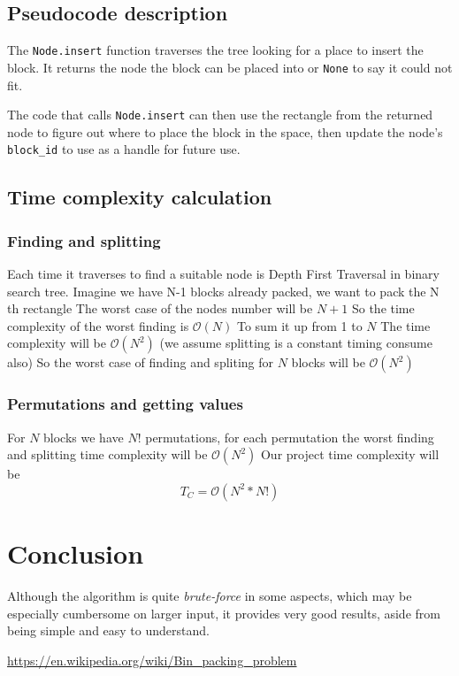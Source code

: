 \subsection{Pseudocode description}
The \texttt{Node.insert} function traverses the tree looking for a place
to insert the block.
It returns the node the block can be placed into or \texttt{None} to say
it could not fit.

The code that calls \texttt{Node.insert} can then use the rectangle
from the returned node to figure out where to place the block in the space,
then update the node's \texttt{block\_id} to use as a handle for future use.

\subsection{Time complexity calculation}

\subsubsection{Finding and splitting}
Each time it traverses to find a suitable node is  Depth First Traversal in binary search tree.
Imagine we have N-1 blocks already packed, we want to pack the N th rectangle
The worst case of the nodes number will be $N+1$
So the time complexity of the worst finding is $\mathcal{O}(N)$
To sum it up from 1 to $N$
The time complexity will be $\mathcal{O}(N^2)$
(we assume splitting is a constant timing consume also) 
So the worst case of finding and spliting for $N$ blocks
will be $\mathcal{O}(N^2)$

\subsubsection{Permutations and getting values}
For $N$ blocks we have $N!$ permutations, for each permutation the worst
finding and splitting time complexity will be $\mathcal{O}(N^2)$
Our project time complexity will be
$$T_C=\mathcal{O}(N^2*N!)$$

\section{Conclusion}
Although the algorithm is quite \textit{brute-force} in some aspects,
which may be especially cumbersome on larger input,
it provides very good results, aside from
being simple and easy to understand.

\newpage
\begin{thebibliography}{9}
	\url{https://en.wikipedia.org/wiki/Bin_packing_problem}
\end{thebibliography}



